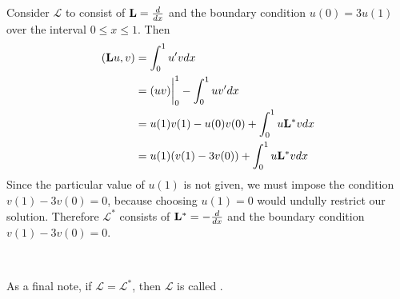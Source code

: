 \begin{example}
	Consider \(\mathcal{L}\) to consist of \(\mathrm{\bf{L}}=\frac{d}{dx}\) and the boundary condition \(u(0)=3u(1)\) over the interval \(0\leq x \leq 1\). Then
	\begin{equation}
		\begin{split}
			(\mathrm{\bf{L}} u,v) &= \int_0^1u'vdx\\
			       &= (uv)\biggr\rvert_0^1 - \int_0^1 uv'dx\\
			       &= u(1)v(1)-u(0)v(0)+\int_0^1u\mathrm{\bf{L^*}} vdx\\
			       &= u(1)(v(1)-3v(0)) + \int_0^1u\mathrm{\bf{L^*}} vdx
		\end{split}
	\end{equation}
	Since the particular value of \(u(1)\) is not given, we must impose the condition \(v(1)-3v(0)=0\), because choosing \(u(1)=0\) would undully restrict our solution. Therefore \(\mathcal{L^*}\) consists of \(\mathrm{\bf{L^*}} = -\frac{d}{dx}\) and the boundary condition \(v(1) - 3v(0)=0\). 
\end{example}

\

As a final note, if \(\mathcal{L}=\mathcal{L}^*\), then \(\mathcal{L}\) is called .
